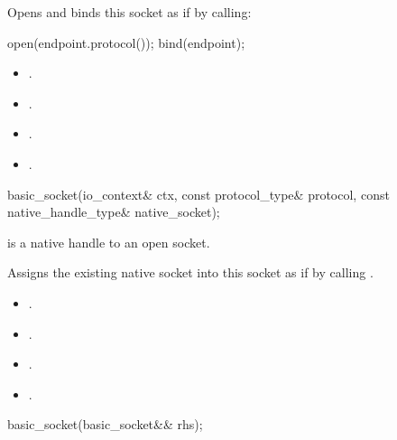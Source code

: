 \begin{itemdescr}
\pnum
\effects Opens and binds this socket as if by calling:
\begin{codeblock}
open(endpoint.protocol());
bind(endpoint);
\end{codeblock}


\pnum
\postconditions
\begin{itemize}
\item
{}.
\item
{}.
\item
{}.
\item
{}.
\end{itemize}
\end{itemdescr}

\begin{itemdecl}
basic_socket(io_context& ctx, const protocol_type& protocol,
             const native_handle_type& native_socket);
\end{itemdecl}

\begin{itemdescr}
\pnum
\requires {} is a native handle to an open socket.

\pnum
\effects Assigns the existing native socket into this socket as if by calling .

\pnum
\postconditions
\begin{itemize}
\item
{}.
\item
{}.
\item
{}.
\item
{}.
\end{itemize}
\end{itemdescr}

\begin{itemdecl}
basic_socket(basic_socket&& rhs);
\end{itemdecl}

